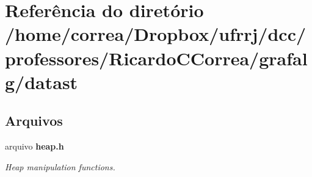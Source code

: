 \section{Referência do diretório /home/correa/\+Dropbox/ufrrj/dcc/professores/\+Ricardo\+C\+Correa/grafalg/datast}
\label{dir_b0a0d3bf0050c0c80504e6aeb7d39309}
\subsection*{Arquivos}
\begin{DoxyCompactItemize}
\item 
arquivo {\bf heap.\+h}
\begin{DoxyCompactList}\small\item\em Heap manipulation functions. \end{DoxyCompactList}\end{DoxyCompactItemize}
